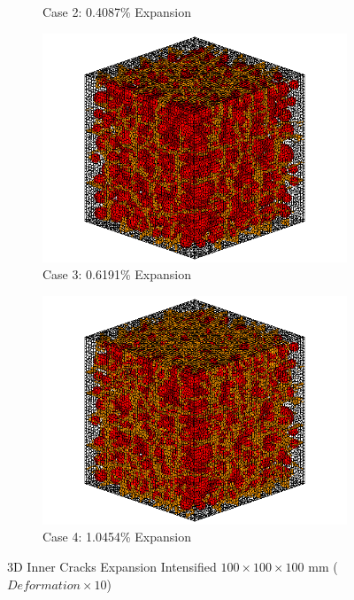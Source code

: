 \begin{figure}[ht!]
\begin{subfigure}{.5\textwidth}
    \caption{Case 2: 0.4087\% Expansion}
    \end{subfigure}%
    \begin{subfigure}{.5\textwidth}
      \centering
      \includegraphics[width=.8\linewidth]{Files/exp_3D/DEF/A30X-1C_3_c.png}
    \caption{Case 3: 0.6191\% Expansion}
    \end{subfigure}
    \begin{subfigure}{.5\textwidth}
      \centering
      \includegraphics[width=.8\linewidth]{Files/exp_3D/DEF/A30X-1C_4_c.png}
    \caption{Case 4: 1.0454\% Expansion}
    \end{subfigure}%

  \caption{3D Inner Cracks Expansion Intensified $100 \times 100 \times 100$ mm ($Deformation \times 10$)}
  \label{fig:DEF_A30X-1C_3Dcasd}
\end{figure}

\clearpage

